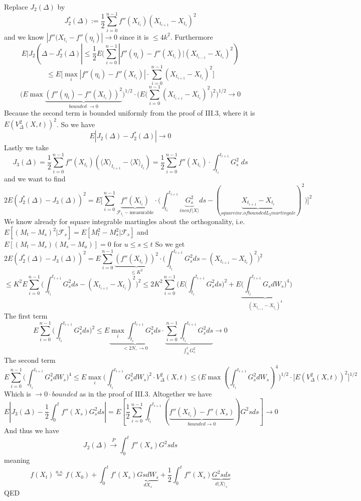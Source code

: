 \documentclass[english]{article}
\newcommand{\ub}{\underbrace}
\newcommand{\F}{\mathcal F}
\newcommand{\as}[1]{\stackrel {a.s.}{#1}}
\begin{document}
Replace $J_2(\Delta)$ by 
$$J^*_2(\Delta) := \frac 12 \sum^{n-1}_{i=0} f''(X_{t_i})(X_{t_{i+1}} - X_{t_{i}})^2$$
and we know $| f'' (X_{t_i} - f'' (\eta_i)| \to 0$ since it is $\leq 4k^2$. Furthermore
$$E|J_2(\Delta - J^*_2(\Delta)| \leq \frac 12 E \Big(\sum^{n-1}_{i=0} |f'' (\eta_i) - f'' (X_{t_i}) | (X_{t_{i-1}} - X_{t_i})^2)$$
$$\leq E\Big[\max_i | f'' (\eta_i) - f'' (X_{t_i})| \cdot \sum^{n-1}_{i=0} (X_{t_{i+1}} - X_{t_i})^2 \Big]$$
$$\Big( E\max \ub{(f'' (\eta_i) - f'' (X_{t_i}))^2}_{bounded\; \to 0} \Big)^{1/2} \cdot \Big( E \Big(\sum^{n-1}_{i=0} (X_{t_{i+1}} - X_{t_i})^2 \Big)^2 \Big)^{1/2} \to 0$$
Because the second term is bounded uniformly from the proof of III.3, where it is $E(V^2_\Delta (X,t))^2$. So we have
$$E|J_2(\Delta) - J^*_2(\Delta)| \to 0$$
Lastly we take
$$J_3(\Delta) = \frac 12 \sum^{n-1}_{i=0} f'' (X_{t_i}) (\langle X \rangle_{t_{i+1}} - \langle X \rangle_{t_i} ) = \frac 12 \sum^{n-1}_{i=0} f'' (X_{t_i}) \cdot \int^{t_{i+1}}_{t_i} G^2_s \; ds$$
and we want to find
$$2 E(J^*_2 (\Delta) - J_3(\Delta))^2 = E \Big[ \sum^{n-1}_{i=0} \ub{f'' (X_{t_i})}_{\F_{t_i}-\text{measurable}} \cdot \Big(\int^{t_{i+1}}_{t_i} \ub{G^2_s}_{inc of \langle X \rangle} ds - (\ub{X_{t_{i+1}} - X_{t_i}}_{square inc. of bounded L_2 martingale})^2 \Big) \Big]^2$$
We know already for square integrable martingles about the orthogonality, i.e. $E[(M_t - M_s)^2| \F_s] = E[M_t^2 - M_s^2 | \F_s]$ and $E[(M_t- M_s)(M_s - M_u)] = 0$ for $u\leq s \leq t$  \newline
So we get
$$2 E(J^*_2 (\Delta) - J_3(\Delta))^2 = E \sum^{n-1}_{i=0} \ub{(f'' (X_{t_i}))^2}_{\leq K^2} \cdot \Big(\int^{t_{i+1}}_{t_i} G^2_s ds - (X_{t_{i+1}} - X_{t_i})^2\Big)^2$$
 $$\leq K^2 E \sum^{n-1}_{i=0} \Big ( \int^{t_{i+1}}_{t_i} G^2_s ds - (X_{t_{i+1}} - X_{t_i})^2 \Big)^2 \leq 2K^2 \sum^{n-1}_{i=0} \Big( E \Big( \int^{t_{i+1}}_{t_i} G^2_s ds \Big)^2 + E\ub{\Big( \int^{t_{i+1}}_{t_i} G_s dW_s)^4}_{(X_{t_{i+1}} - X_{t_i})^4} \Big)$$
The first term
$$E \sum^{n-1}_{i=0} \Big(\int^{t_{i+1}}_{t_i} G^2_s ds \Big)^2 \leq E \ub{\max_i \int^{t_{i+1}}_{t_i} G^2_s ds}_{<2N, \to 0} \cdot \ub{\sum^{n-1}_{i=0} \int^{t_{i+1}}_{t_i} G^2_s ds}_{\int^t_0 G^2_s} \to 0$$
The second term
$$E\sum^{n-1}_{i=0} \Big(\int^{t_{i+1}}_{t_i} G^2_s dW_s\Big)^4 \leq E \max_i \Big( \int^{t_{i+1}}_{t_i} G^2_s dW_s\Big)^2 \cdot V^2_\Delta(X,t) \leq \Big( E \max (\int^{t_{i+1}}_{t_i} G^2_s dW_s)^4\Big)^{1/2} \cdot \Big[E(V^2_\Delta(X, t))^2 \Big]^{1/2}$$
Which is $\to 0 \cdot bounded$ as in the proof of III.3. \newline
Altogether we have
$$E|J_3(\Delta) - \frac 12 \int^t_0 f''(X_s) G^2_s ds| = E [ \frac 12 \sum^{n-1}_{i=0} \int^{t_{i+1}}_{t_i} (\ub{f''(X_{t_i}) - f'' (X_s)}_{bounded \to 0}) G^2s ds ] \to 0$$
And thus we have
$$J_2(\Delta) \stackrel P\to \int^t_0 f'' (X_s) G^2s ds$$
meaning
$$f(X_t) \as = f(X_0) + \int^t_0 f'(X_s) \ub{Gs dW_s}_{dX_s} + \frac 12 \int^t_0 f'' (X_s) \ub{G^2s ds}_{d \langle X \rangle_s}$$
QED \newline
\end{document}
